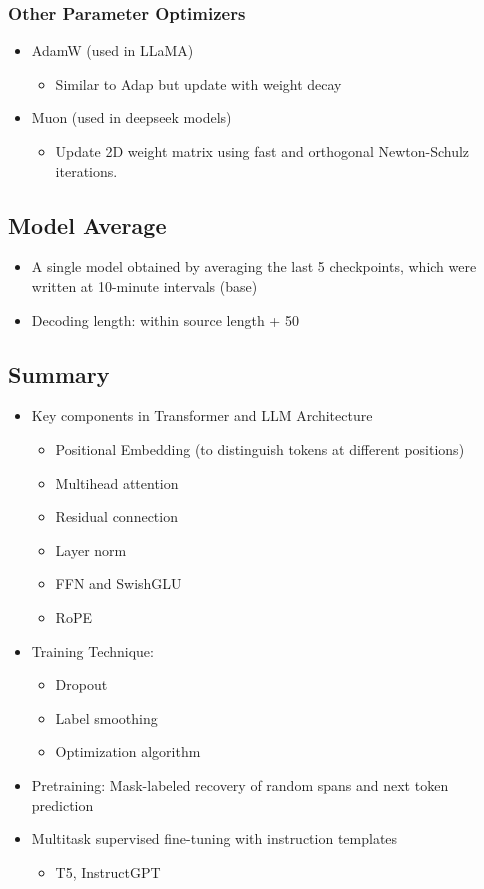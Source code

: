 \documentclass[10pt]{article}
\begin{document}
\subsubsection*{Other Parameter Optimizers}
\begin{itemize}
	\item AdamW (used in LLaMA)
	\begin{itemize}
	    \item Similar to Adap but update with weight decay
    \end{itemize}
    \item Muon (used in deepseek models)
    \begin{itemize}
	    \item Update 2D weight matrix using fast and orthogonal Newton-Schulz iterations.
    \end{itemize}
\end{itemize}

\subsection*{Model Average}
\begin{itemize}
	\item A single model obtained by averaging the last 5 checkpoints, which were written at 10-minute intervals (base)
	\item Decoding length: within source length + 50
\end{itemize}

\subsection*{Summary}
\begin{itemize}
    \item Key components in Transformer and LLM Architecture
    \begin{itemize}
        \item Positional Embedding (to distinguish tokens at different positions)
        \item Multihead attention
        \item Residual connection
        \item Layer norm
        \item FFN and SwishGLU
        \item RoPE
    \end{itemize}
    \item Training Technique:
    \begin{itemize}
        \item Dropout
        \item Label smoothing
        \item Optimization algorithm
    \end{itemize}
    \item Pretraining: Mask-labeled recovery of random spans and next token prediction
    \item Multitask supervised fine-tuning with instruction templates
    \begin{itemize}
        \item T5, InstructGPT
    \end{itemize}
\end{itemize}
\end{document}
